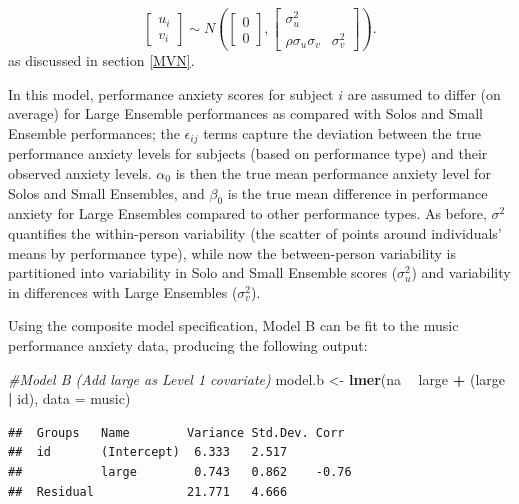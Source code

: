 \documentclass[
]{krantz}
\newenvironment{Shaded}{\begin{snugshade}}{\end{snugshade}}
\newcommand{\CommentTok}[1]{\textcolor[rgb]{0.37,0.37,0.37}{\textit{#1}}}
\newcommand{\DataTypeTok}[1]{\textcolor[rgb]{0.27,0.27,0.27}{#1}}
\newcommand{\KeywordTok}[1]{\textcolor[rgb]{0.27,0.27,0.27}{\textbf{#1}}}
\newcommand{\NormalTok}[1]{#1}
\newcommand{\OperatorTok}[1]{\textcolor[rgb]{0.43,0.43,0.43}{\textbf{#1}}}
\newcommand{\StringTok}[1]{\textcolor[rgb]{0.5,0.5,0.5}{#1}}
\begin{document}
\[ \left[ \begin{array}{c}
            u_{i} \\ v_{i}
          \end{array}  \right] \sim N \left( \left[
          \begin{array}{c}
            0 \\ 0
          \end{array} \right], \left[
          \begin{array}{cc}
            \sigma_{u}^{2} & \\
            \rho\sigma_{u}\sigma_{v} & \sigma_{v}^{2}
          \end{array} \right] \right). \]
as discussed in section \ref{MVN}.

In this model, performance anxiety scores for subject \(i\) are assumed to differ (on average) for Large Ensemble performances as compared with Solos and Small Ensemble performances; the \(\epsilon_{ij}\) terms capture the deviation between the true performance anxiety levels for subjects (based on performance type) and their observed anxiety levels. \(\alpha_{0}\) is then the true mean performance anxiety level for Solos and Small Ensembles, and \(\beta_{0}\) is the true mean difference in performance anxiety for Large Ensembles compared to other performance types. As before, \(\sigma^2\) quantifies the within-person variability (the scatter of points around individuals' means by performance type), while now the between-person variability is partitioned into variability in Solo and Small Ensemble scores (\(\sigma_{u}^{2}\)) and variability in differences with Large Ensembles (\(\sigma_{v}^{2}\)).

Using the composite model specification, Model B can be fit to the music performance anxiety data, producing the following output:

\begin{Shaded}
\begin{Highlighting}[]
\CommentTok{#Model B (Add large as Level 1 covariate)}
\NormalTok{model.b <-}\StringTok{ }\KeywordTok{lmer}\NormalTok{(na }\OperatorTok{~}\StringTok{ }\NormalTok{large }\OperatorTok{+}\StringTok{  }\NormalTok{(large }\OperatorTok{|}\StringTok{ }\NormalTok{id), }\DataTypeTok{data =}\NormalTok{ music)}
\end{Highlighting}
\end{Shaded}

\begin{verbatim}
##  Groups   Name        Variance Std.Dev. Corr 
##  id       (Intercept)  6.333   2.517         
##           large        0.743   0.862    -0.76
##  Residual             21.771   4.666
\end{verbatim}
\end{document}

